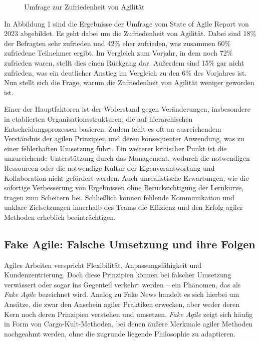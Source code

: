 \documentclass[ngerman]{seminarvorlage}
\begin{document}
\begin{figure}[ht]
    \label{umfrage}
    \caption{Umfrage zur Zufriedenheit von Agilität}
\end{figure}

In Abbildung 1 sind die Ergebnisse der Umfrage vom State of Agile Report von 2023 abgebildet. Es geht dabei um die Zufriedenheit von Agilität. Dabei sind 18\% der Befragten sehr zufrieden und 42\% eher zufrieden, was zusammen 60\% zufriedene Teilnehmer ergibt. Im Vergleich zum Vorjahr, in dem noch 72\% zufrieden waren, stellt dies einen Rückgang dar. Außerdem sind 15\% gar nicht zufrieden, was ein deutlicher Anstieg im Vergleich zu den 6\% des Vorjahres ist. Nun stellt sich die Frage, warum die Zufriedenheit von Agilität weniger geworden ist.

Einer der Hauptfaktoren ist der Widerstand gegen Veränderungen, insbesondere in etablierten Organisationsstrukturen, die auf hierarchischen Entscheidungsprozessen basieren. 
Zudem fehlt es oft an ausreichendem Verständnis der agilen Prinzipien und deren konsequenter Anwendung, was zu einer fehlerhaften Umsetzung führt. 
Ein weiterer kritischer Punkt ist die unzureichende Unterstützung durch das Management, wodurch die notwendigen Ressourcen oder die notwendige Kultur der Eigenverantwortung und Kollaboration nicht gefördert werden. 
Auch unrealistische Erwartungen, wie die sofortige Verbesserung von Ergebnissen ohne Berücksichtigung der Lernkurve, tragen zum Scheitern bei. Schließlich können fehlende Kommunikation und unklare Zielsetzungen innerhalb des Teams die Effizienz und den Erfolg agiler Methoden erheblich beeinträchtigen.

\subsection{Fake Agile: Falsche Umsetzung und ihre Folgen}

Agiles Arbeiten verspricht Flexibilität, Anpassungsfähigkeit und Kundenzentrierung. Doch diese Prinzipien können bei falscher Umsetzung verwässert oder sogar ins Gegenteil verkehrt werden – ein Phänomen, das als \textit{Fake Agile} bezeichnet wird. Analog zu \glqq Fake News\grqq{} handelt es sich hierbei um Ansätze, die zwar den Anschein agiler Praktiken erwecken, aber weder deren Kern noch deren Prinzipien verstehen und umsetzen. \textit{Fake Agile} zeigt sich häufig in Form von Cargo-Kult-Methoden, bei denen äußere Merkmale agiler Methoden nachgeahmt werden, ohne die zugrunde liegende Philosophie zu adaptieren.
\end{document}
